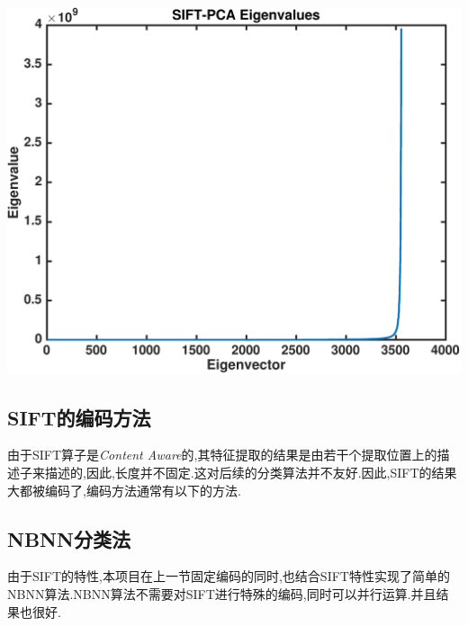 			\begin{center}
		\begin{minipage}[t]{\linewidth}
		\center
		{
		\includegraphics[width=\textwidth]{Img/c3/sift_pca_eigen} 
		}
		\end{minipage}
		\medskip
		\end{center}
		
		

\subsection{SIFT的编码方法}
由于SIFT算子是\textit{Content Aware}的,其特征提取的结果是由若干个提取位置上的描述子来描述的,因此,长度并不固定.这对后续的分类算法并不友好.因此,SIFT的结果大都被编码了,编码方法通常有以下的方法.\cite{chatfield2011devil}

\subsection{NBNN分类法}
由于SIFT的特性,本项目在上一节固定编码的同时,也结合SIFT特性实现了简单的NBNN算法.NBNN算法不需要对SIFT进行特殊的编码,同时可以并行运算.并且结果也很好.